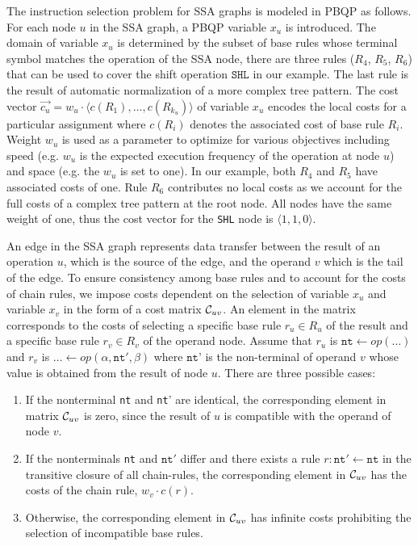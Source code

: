 The instruction selection problem for SSA graphs is modeled in PBQP as
follows. For each node $u$ in the SSA graph, a PBQP variable $x_u$ is
introduced. The domain of variable $x_u$ is determined by the subset
of base rules whose terminal symbol matches the operation of the SSA
node, \eg there are three rules ($R_4$, $R_5$, $R_6$) that can be
used to cover the shift operation $\texttt{SHL}$ in our example. The
last rule is the result of automatic normalization of a more complex
tree pattern.
The cost vector $\vec{c_u}= w_u \cdot \langle c(R_1), \dots,
c(R_{k_u}) \rangle$ of variable $x_u$ encodes the local costs for a
particular assignment where $c(R_i)$ denotes the associated cost of
base rule $R_i$. Weight $w_u$ is used as a parameter to optimize for
various objectives including speed (e.g. $w_u$ is the expected
execution frequency of the operation at node $u$) and space (e.g. the
$w_u$ is set to one). In our example, both $R_4$ and $R_5$ have
associated costs of one. Rule $R_6$ contributes no local costs as we
account for the full costs of a complex tree pattern at the root
node. All nodes have the same weight of one, thus the cost vector for
the \texttt{SHL} node is $\langle1, 1, 0 \rangle$.

An edge in the SSA graph represents data transfer between the result
of an operation $u$, which is the source of the edge, and the operand
$v$ which is the tail of the edge.  To ensure consistency among base
rules and to account for the costs of chain rules, we impose costs
dependent on the selection of variable $x_u$ and variable $x_v$ in the
form of a cost matrix $\mathcal C_{uv}$. An element in the matrix
corresponds to the costs of selecting a specific base rule $r_u \in
R_u$ of the result and a specific base rule $r_v \in R_v$ of the
operand node. Assume that $r_u $ is $\texttt{nt} \leftarrow
\textit{op} (\dots)$ and $r_v$ is $\dots \leftarrow \textit{op}
(\alpha, \texttt{nt}', \beta)$ where $\texttt{nt'}$ is the
non-terminal of operand $v$ whose value is obtained from the result of
node $u$. There are three possible cases:
\begin{enumerate}
\item If the nonterminal \texttt{nt} and \texttt{nt}' are identical,
  the corresponding element in matrix $\mathcal C_{uv}$ is zero,
  since the result of $u$ is compatible with the operand of node $v$.
\item If the nonterminals \texttt{nt} and $\texttt{nt}'$ differ and
  there exists a rule $r: \texttt{nt}' \leftarrow \texttt{nt}$ in the
  transitive closure of all chain-rules, the corresponding element in
  $\mathcal C_{uv}$ has the costs of the chain rule, \ie $w_v \cdot
  c(r)$.
\item Otherwise, the corresponding element in $\mathcal C_{uv}$ has
  infinite costs prohibiting the selection of incompatible base rules.
\end{enumerate}

